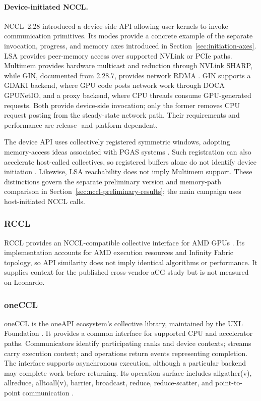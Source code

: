 \paragraph{Device-initiated NCCL.} NCCL~2.28 introduced a device-side API allowing user kernels to invoke communication primitives. Its modes provide a concrete example of the separate invocation, progress, and memory axes introduced in Section~\ref{sec:initiation-axes}. LSA provides peer-memory access over supported NVLink or PCIe paths. Multimem provides hardware multicast and reduction through NVLink SHARP, while \ac{GIN}, documented from 2.28.7, provides network RDMA \cite{hamidouche_kernel-initiated_2026,nvidia_nccl_device_2026}. GIN supports a GDAKI backend, where GPU code posts network work through DOCA GPUNetIO, and a proxy backend, where CPU threads consume GPU-generated requests. Both provide device-side invocation; only the former removes CPU request posting from the steady-state network path. Their requirements and performance are release- and platform-dependent.

The device API uses collectively registered symmetric windows, adopting memory-access ideas associated with PGAS systems \cite{hamidouche_gpu-initiated_2025}. Such registration can also accelerate host-called collectives, so registered buffers alone do not identify device initiation \cite{nvidia_nccl_registration_2026}. Likewise, LSA reachability does not imply Multimem support. These distinctions govern the separate preliminary version and memory-path comparison in Section~\ref{sec:nccl-preliminary-results}; the main campaign uses host-initiated NCCL calls.

\subsubsection{RCCL}\label{sec:rccl}
RCCL provides an NCCL-compatible collective interface for AMD GPUs \cite{amd_rccl_2026,amd_rccl_repo}. Its implementation accounts for AMD execution resources and Infinity Fabric topology, so API similarity does not imply identical algorithms or performance. It supplies context for the published cross-vendor aCG study but is not measured on Leonardo.

\subsubsection{oneCCL}\label{sec:oneccl}
oneCCL is the oneAPI ecosystem's collective library, maintained by the \ac{UXL} Foundation \cite{uxl_oneccl_2026}. It provides a common interface for supported CPU and accelerator paths. Communicators identify participating ranks and device contexts; streams carry execution context; and operations return events representing completion. The interface supports asynchronous execution, although a particular backend may complete work before returning. Its operation surface includes allgather(v), allreduce, alltoall(v), barrier, broadcast, reduce, reduce-scatter, and point-to-point communication \cite{weingram_xccl_2023,unat_landscape_2026}.

